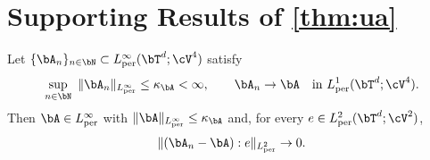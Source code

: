 \section{Supporting Results of \cref{thm:ua}}\label{app:ua}

\begin{lemma}\label{lem:strong_conv_tensor}
Let $\{\bA_n\}_{n\in\bN}\subset L^\infty_{\rm per}(\bT^d;\cV^4)$ satisfy
\begin{equation*}
\sup_{n\in\bN}\ \|\bA_n\|_{L^\infty_{\rm per}}\le \kappa_{\bA}<\infty,
\qquad
\bA_n\to\bA \quad \text{in }L^1_{\rm per}(\bT^d;\cV^4).
\end{equation*}
Then $\bA\in L^\infty_{\rm per}$ with $\|\bA\|_{L^\infty_{\rm per}}\le \kappa_{\bA}$ and, for every $e\in L^2_{\rm per}(\bT^d;\cV^{2})$,
\begin{equation}\label{eq:strong_conv_tensor}
\| (\bA_n-\bA):e\|_{L^2_{\rm per}}\to 0.
\end{equation}
\end{lemma}

